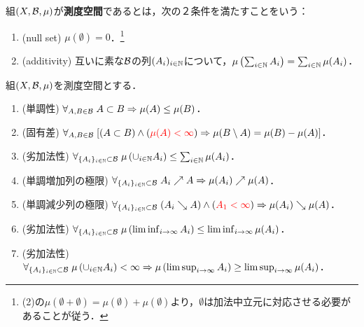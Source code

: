 \documentclass[uplatex, dvipdfmx]{jsreport}
\begin{document}
\begin{definition}
    組$(X,\mathcal{B},\mu)$が\textbf{測度空間}であるとは，次の２条件を満たすことをいう：
    \begin{enumerate}
        \item (null set) $\mu(\emptyset)=0$．\footnote{(2)の$\mu(\emptyset+\emptyset)=\mu(\emptyset)+\mu(\emptyset)$より，$\emptyset$は加法中立元に対応させる必要があることが従う．}
        \item (additivity) 互いに素な$\mathcal{B}$の列$(A_i)_{i\in\mathbb{N}}$について，$\mu\left(\sum_{i\in\mathbb{N}}A_i\right)=\sum_{i\in\mathbb{N}}\mu(A_i)$．
    \end{enumerate}
\end{definition}

\begin{lemma}[測度の性質]\label{lemma-character-of-measure}
    組$(X,\mathcal{B},\mu)$を測度空間とする．
    \begin{enumerate}
        \item (単調性) $\forall_{A,B\in\mathcal{B}}\;A\subset B\Rightarrow\mu(A)\le\mu(B)$．
        \item (固有差) $\forall_{A,B\in\mathcal{B}}\;[(A\subset B)\land(\textcolor{red}{\mu(A)<\infty})\Rightarrow\mu(B\setminus A)=\mu(B)-\mu(A)]$．
        \item (劣加法性) $\forall_{\{A_i\}_{i\in\mathbb{N}}\subset\mathcal{B}}\;\mu\left(\cup_{i\in\mathbb{N}}A_i\right)\le\sum_{i\in\mathbb{N}}\mu(A_i)$．
        \item (単調増加列の極限) $\forall_{\{A_i\}_{i\in\mathbb{N}}\subset\mathcal{B}}\;A_i\nearrow A\Rightarrow\mu(A_i)\nearrow\mu(A)$．
        \item (単調減少列の極限) $\forall_{\{A_i\}_{i\in\mathbb{N}}\subset\mathcal{B}}\;(A_i\searrow A)\land(\textcolor{red}{A_1<\infty})\Rightarrow\mu(A_i)\searrow\mu(A)$．
        \item (劣加法性) $\forall_{\{A_i\}_{i\in\mathbb{N}}\subset\mathcal{B}}\;\mu\left(\liminf_{i\to\infty}A_i\right)\le\liminf_{i\to\infty}\mu(A_i)$．
        \item (劣加法性) $\forall_{\{A_i\}_{i\in\mathbb{N}}\subset\mathcal{B}}\;\mu\left(\cup_{i\in\mathbb{N}}A_i\right)<\infty\Rightarrow\mu\left(\limsup_{i\to\infty}A_i\right)\ge\limsup_{i\to\infty}\mu(A_i)$．
    \end{enumerate}
\end{lemma}
\end{document}
